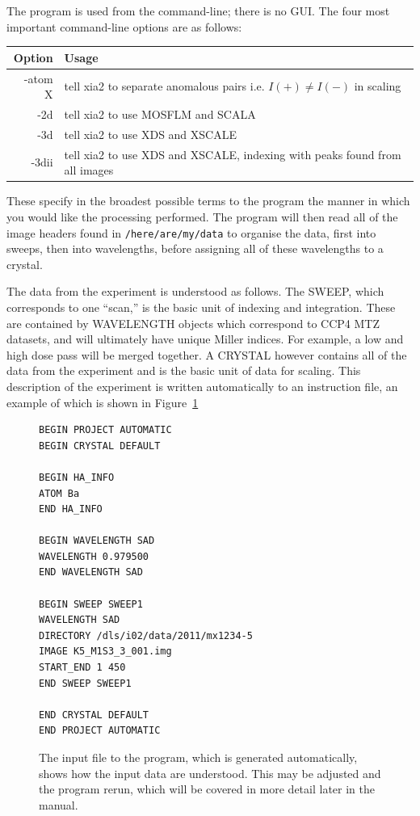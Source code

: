 \documentclass[a4paper, 11pt]{article}
\begin{document}
The program is used from the command-line; there is no GUI. The four most
important command-line options are as follows:

\begin{center}
\begin{tabular}{|r|p{6cm}|}
\hline
Option & Usage \\
\hline
-atom X & tell xia2 to separate anomalous pairs i.e. $I(+) \ne I(-)$ in 
scaling \\
-2d & tell xia2 to use MOSFLM and SCALA \\
-3d & tell xia2 to use XDS and XSCALE \\
-3dii & tell xia2 to use XDS and XSCALE, indexing with peaks found from
all images \\
\hline
\end{tabular}
\end{center}

\noindent
These specify in the broadest possible terms to the program the manner in
which you would like the processing performed. The program will then read all 
of the image headers found in \verb|/here/are/my/data| to organise the data, 
first into sweeps, then into wavelengths, before assigning all of these
wavelengths to a crystal.

The data from the experiment is understood as follows. The SWEEP, which 
corresponds to one ``scan,'' is the basic unit of indexing and integration.
These are contained by WAVELENGTH objects which correspond to CCP4 MTZ 
datasets, and will ultimately have unique Miller indices. For example, a low
and high dose pass will be merged together. A CRYSTAL however contains all 
of the data from the experiment and is the basic unit of data for scaling.
This description of the experiment is written automatically to an instruction
file, an example of which is shown in Figure~\ref{figure-input}

\begin{figure}
\begin{center}
{\small
\begin{verbatim}
BEGIN PROJECT AUTOMATIC
BEGIN CRYSTAL DEFAULT

BEGIN HA_INFO
ATOM Ba
END HA_INFO

BEGIN WAVELENGTH SAD
WAVELENGTH 0.979500
END WAVELENGTH SAD

BEGIN SWEEP SWEEP1
WAVELENGTH SAD
DIRECTORY /dls/i02/data/2011/mx1234-5
IMAGE K5_M1S3_3_001.img
START_END 1 450
END SWEEP SWEEP1

END CRYSTAL DEFAULT
END PROJECT AUTOMATIC
\end{verbatim}
}
\end{center}
\caption{The input file to the program, which is generated automatically, shows
how the input data are understood. This may be adjusted and the program rerun,
which will be covered in more detail later in the manual. \label{figure-input}}
\end{figure}
\end{document}
